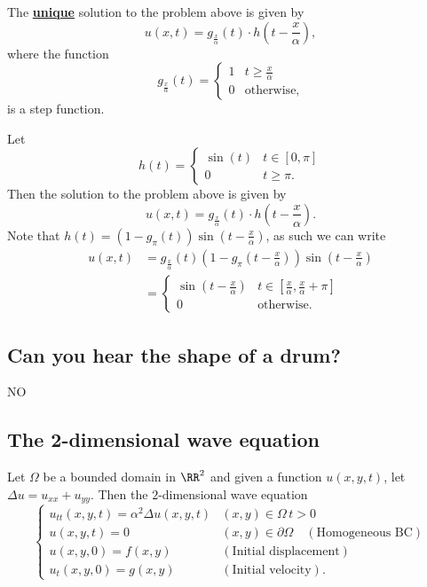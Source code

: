\documentclass[12pt, a4paper]{article}
\begin{document}
\begin{mdthm}
    The \underline{\textbf{unique}} solution to the problem above is given by 
    \[u(x,t) = g_{\frac{x}{\alpha}}(t) \cdot h\left( t-\frac{x}{\alpha} \right),\]
    where the function 
    \[g_{\frac{x}{\alpha}}(t) = \begin{cases}
        1 & t \geq \frac{x}{\alpha} \\
        0 & \text{otherwise},
    \end{cases}\]
    is a step function.
\end{mdthm}

\begin{mdexample}
    Let 
    \[h(t) = \begin{cases}
        \sin(t) & t \in [0,\pi] \\
        0 & t\geq \pi.
    \end{cases}\]
    Then the solution to the problem above is given by 
    \[u(x,t) = g_{\frac{x}{\alpha}}(t) \cdot h\left( t-\frac{x}{\alpha} \right).\]
    Note that \(h(t) = (1-g_{\pi}(t))\sin\left( t-\frac{x}{\alpha} \right)\), as such we can write 
    \[\begin{aligned}
        u(x,t) &= g_{\frac{x}{\alpha}}(t) \left( 1- g_{\pi} \left( t-\frac{x}{\alpha} \right)\right)\sin\left( t-\frac{x}{\alpha} \right) \\
        &= \begin{cases}
            \sin\left( t-\frac{x}{\alpha} \right) & t\in \left[ \frac{x}{\alpha},\frac{x}{\alpha}+\pi \right] \\
            0 & \text{otherwise}.
        \end{cases}
    \end{aligned}\]
\end{mdexample}

\subsection{Can you hear the shape of a drum?}

NO

\subsection{The 2-dimensional wave equation}

Let \(\Omega\) be a bounded domain in \(\RR^2\) and given a function \(u(x,y,t)\), let \(\Delta u = u_{xx}+u_{yy}\). Then the \(2\)-dimensional wave equation
\[\begin{cases}
    u_{tt}(x,y,t) = \alpha^2 \Delta u(x,y,t) & (x,y) \in \Omega \, t>0 \\
    u(x,y,t)=0 & (x,y) \in \partial \Omega \quad (\text{Homogeneous BC}) \\
    u(x,y,0)=f(x,y) & (\text{Initial displacement}) \\
    u_t(x,y,0)=g(x,y) & (\text{Initial velocity}).
\end{cases}\]
\end{document}
